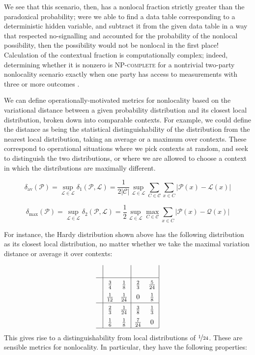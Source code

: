 \documentclass{amsart}
\theoremstyle{definition}
\begin{document}
We see that this scenario, then, has a nonlocal fraction strictly greater than the paradoxical probability; were we able to find a data table corresponding to a deterministic hidden variable, and subtract it from the given data table in a way that respected no-signalling and accounted for the probability of the nonlocal possibility, then the possibility would not be nonlocal in the first place!
Calculation of the contextual fraction is computationally complex; indeed, determining whether it is nonzero is \textsc{NP-complete} for a 
nontrivial two-party nonlocality scenario exactly when one party has access to measurements with three or more outcomes \cite{SimmCC}.

We can define operationally-motivated metrics for nonlocality based on the variational distance between a given probability distribution and its closest local distribution, broken down into comparable contexts. For example, we could define the distance as being the statistical distinguishability of the distribution from the nearest local distribution, taking an average or a maximum over contexts. These correspond to operational situations where we pick contexts at random, and seek to distinguish the two distributions, or where we are allowed to choose a context in which the distributions are maximally different.

\begin{equation}
\delta_{\mbox{av}}(\mathcal{P})=\sup_{\mathcal{L}\in\mathscr{L}}\delta_1(\mathcal{P},\mathcal{L})=\frac{1}{2\left|\mathcal{C}\right|}\sup_{\mathcal{L}\in\mathscr{L}}\sum_{C\in\mathcal{C}}\sum_{x\in C}\left|\mathcal{P}(x)-\mathcal{L}(x)\right|
\end{equation}

\begin{equation}
\delta_{\mbox{max}}(\mathcal{P})=\sup_{\mathcal{L}\in\mathscr{L}}\delta_2(\mathcal{P},\mathcal{L})=\frac{1}{2}\sup_{\mathcal{L}\in\mathscr{L}}\max_{C\in\mathcal{C}}\sum_{x\in C}\left|\mathcal{P}(x)-\mathcal{Q}(x)\right|
\end{equation}

For instance, the Hardy distribution shown above has the following distribution as its closest local distribution, no matter whether we take the maximal variation distance or average it over contexts:

\begin{equation}\renewcommand{\arraystretch}{1.5}
\begin{array}{c| c c | c c |} 
&&&&\\\hline
&\frac{3}{4} &\frac{1}{8}  &\frac{2}{3} & \frac{5}{24}\\
&\frac{1}{12} &\frac{1}{24}  &0 &\frac{1}{8}\\ \hline
&\frac{2}{3}&\frac{1}{24}&\frac{3}{8} &\frac{1}{3} \\
&\frac{1}{6}&\frac{1}{8} &\frac{7}{24} &0 \\ \hline
\end{array} \renewcommand{\arraystretch}{1}
\end{equation}
This gives rise to a distinguishability from local distributions of $\nicefrac{1}{24}$.
These are sensible metrics for nonlocality. In particular, they have the following properties:
\end{document}
